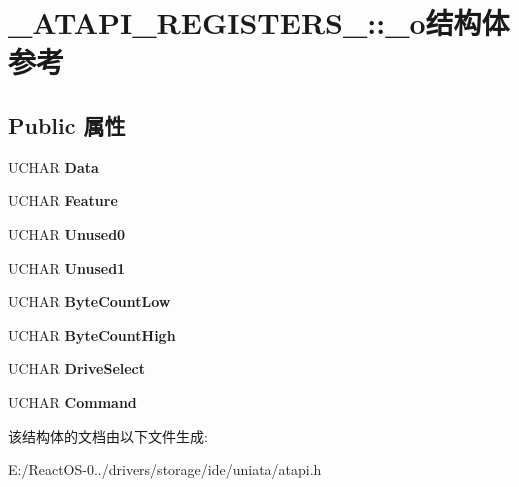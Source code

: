 \hypertarget{struct___a_t_a_p_i___r_e_g_i_s_t_e_r_s__1_1_1__o}{}\section{\+\_\+\+A\+T\+A\+P\+I\+\_\+\+R\+E\+G\+I\+S\+T\+E\+R\+S\+\_\+:\+:\+\_\+o结构体 参考}
\label{struct___a_t_a_p_i___r_e_g_i_s_t_e_r_s__1_1_1__o}
\subsection*{Public 属性}
\begin{DoxyCompactItemize}
\item 
\mbox{\label{struct___a_t_a_p_i___r_e_g_i_s_t_e_r_s__1_1_1__o_aad10b07af60154b451bbfec1a5040cd4}} 
U\+C\+H\+AR {\bfseries Data}
\item 
\mbox{\label{struct___a_t_a_p_i___r_e_g_i_s_t_e_r_s__1_1_1__o_a40274c6b883cd98c88739eafc9a6b476}} 
U\+C\+H\+AR {\bfseries Feature}
\item 
\mbox{\label{struct___a_t_a_p_i___r_e_g_i_s_t_e_r_s__1_1_1__o_a66e7e01f00c9b6d25faf696474d7317d}} 
U\+C\+H\+AR {\bfseries Unused0}
\item 
\mbox{\label{struct___a_t_a_p_i___r_e_g_i_s_t_e_r_s__1_1_1__o_a92f76724fb4ea54b5110bffb793db9b3}} 
U\+C\+H\+AR {\bfseries Unused1}
\item 
\mbox{\label{struct___a_t_a_p_i___r_e_g_i_s_t_e_r_s__1_1_1__o_aa18bdc773c19f91b64a384983e245c96}} 
U\+C\+H\+AR {\bfseries Byte\+Count\+Low}
\item 
\mbox{\label{struct___a_t_a_p_i___r_e_g_i_s_t_e_r_s__1_1_1__o_a319cfb8282bd34b872d9e48a7ef16385}} 
U\+C\+H\+AR {\bfseries Byte\+Count\+High}
\item 
\mbox{\label{struct___a_t_a_p_i___r_e_g_i_s_t_e_r_s__1_1_1__o_a314b1f40e40222a337c62bea83817cdc}} 
U\+C\+H\+AR {\bfseries Drive\+Select}
\item 
\mbox{\label{struct___a_t_a_p_i___r_e_g_i_s_t_e_r_s__1_1_1__o_a60e7743b8cb6c1da381a9b2fa0e70fbc}} 
U\+C\+H\+AR {\bfseries Command}
\end{DoxyCompactItemize}


该结构体的文档由以下文件生成\+:\begin{DoxyCompactItemize}
\item 
E\+:/\+React\+O\+S-\/0../drivers/storage/ide/uniata/atapi.\+h\end{DoxyCompactItemize}
